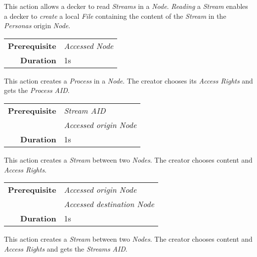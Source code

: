 \hfill

This action allows a decker to read \emph{Streams} in a \emph{Node}.
\emph{Reading} a \emph{Stream} enables a decker to \emph{create} a local \emph{File}
containing the content of the \emph{Stream} in the \emph{Personas} origin
\emph{Node}.

\label{par:start process}

\begin{tabular}{rl}
    \textbf{Prerequisite} & \emph{Accessed Node} \\
    \textbf{Duration}     & 1s                   \\
\end{tabular}

\hfill

This action creates a \emph{Process} in a \emph{Node}. The creator chooses its
\emph{Access Rights} and gets the \emph{Process} \emph{AID}.

\label{par:send}

\begin{tabular}{rl}
    \textbf{Prerequisite} & \emph{Stream AID}           \\
                          & \emph{Accessed origin Node} \\
    \textbf{Duration}     & 1s                          \\
\end{tabular}

\hfill

This action creates a \emph{Stream} between two \emph{Nodes}. The creator chooses
content and \emph{Access Rights}.

\label{par:start stream}

\begin{tabular}{rl}
    \textbf{Prerequisite} & \emph{Accessed origin Node}      \\
                          & \emph{Accessed destination Node} \\
    \textbf{Duration}     & 1s                               \\
\end{tabular}

\hfill

This action creates a \emph{Stream} between two \emph{Nodes}. The creator chooses
content and \emph{Access Rights} and gets the \emph{Streams} \emph{AID}.

\label{par:stop process}

